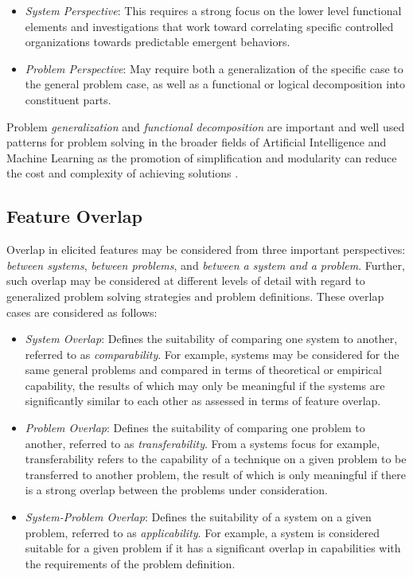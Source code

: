 \documentclass[a4paper, 11pt]{article}
\begin{document}
\begin{itemize}
	\item \emph{System Perspective}: This requires a strong focus on the lower level functional elements and investigations that work toward correlating specific controlled organizations towards predictable emergent behaviors. 
	\item \emph{Problem Perspective}: May require both a generalization of the specific case to the general problem case, as well as a functional or logical decomposition into constituent parts.
\end{itemize}

Problem \emph{generalization} and \emph{functional decomposition} are important and well used patterns for problem solving in the broader fields of Artificial Intelligence and Machine Learning as the promotion of simplification and modularity can reduce the cost and complexity of achieving solutions \cite{Russell2009, Brooks1986}.

%
%
\subsection{Feature Overlap}
Overlap in elicited features may be considered from three important perspectives: \emph{between systems}, \emph{between problems}, and \emph{between a system and a problem}. Further, such overlap may be considered at different levels of detail with regard to generalized problem solving strategies and problem definitions.
These overlap cases are considered as follows:

\begin{itemize}
	\item \emph{System Overlap}: Defines the suitability of comparing one system to another, referred to as \emph{comparability}. For example, systems may be considered for the same general problems and compared in terms of theoretical or empirical capability, the results of which may only be meaningful if the systems are significantly similar to each other as assessed in terms of feature overlap. 
	\item \emph{Problem Overlap}: Defines the suitability of comparing one problem to another, referred to as \emph{transferability}. From a systems focus for example, transferability refers to the capability of a technique on a given problem to be transferred to another problem, the result of which is only meaningful if there is a strong overlap between the problems under consideration.
	\item \emph{System-Problem Overlap}: Defines the suitability of a system on a given problem, referred to as \emph{applicability}. For example, a system is considered suitable for a given problem if it has a significant overlap in capabilities with the requirements of the problem definition.
\end{itemize}
\end{document}
